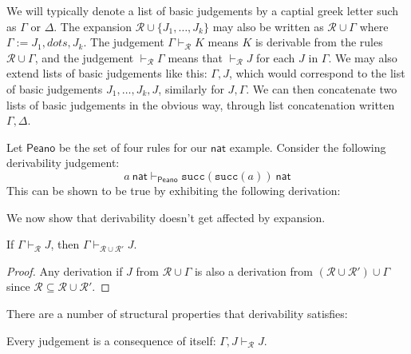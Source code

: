 \begin{remark}
    We will typically denote a list of basic judgements by a captial greek letter such as $\Gamma$ or $\Delta$. The expansion $\mathcal{R} \cup \{ J_1, \dots, J_k \}$ may also be written as $\mathcal{R} \cup \Gamma$ where $\Gamma := J_1, dots, J_k$. The judgement $\Gamma \vdash_{\mathcal{R}} K$ means $K$ is derivable from the rules $\mathcal{R} \cup \Gamma$, and the judgement $\vdash _{\mathcal{R}} \Gamma$ means that $\vdash _{\mathcal{R}} J$ for each $J$ in $\Gamma$. We may also extend lists of basic judgements like this: $\Gamma, J$, which would correspond to the list of basic judgements $J_1, \dots, J_k, J$, similarly for $J, \Gamma$. We can then concatenate two lists of basic judgements in the obvious way, through list concatenation written $\Gamma, \Delta$.
\end{remark}

\begin{example}
    Let $\mathsf{Peano}$ be the set of four rules for our $\mathsf{nat}$ example. Consider the following derivability judgement:
    $$a\ \mathsf{nat} \vdash_{\mathsf{Peano}} \texttt{succ}(\texttt{succ}(a))\ \mathsf{nat}$$
    This can be shown to be true by exhibiting the following derivation:
    \begin{prooftree}
    \end{prooftree}
\end{example}

We now show that derivability doesn't get affected by expansion.

\begin{lemma}[Stability]
    If $\Gamma \vdash_{\mathcal{R}} J$, then $\Gamma \vdash_{\mathcal{R} \cup \mathcal{R'}} J$.
\end{lemma}

\begin{proof}
    Any derivation if $J$ from $\mathcal{R} \cup \Gamma$ is also a derivation from $(\mathcal{R} \cup \mathcal{R}') \cup \Gamma$ since $\mathcal{R} \subseteq \mathcal{R}\cup \mathcal{R}'$.
\end{proof}

There are a number of structural properties that derivability satisfies:

\begin{lemma}[Reflexivity]
    Every judgement is a consequence of itself: $\Gamma, J\vdash_{\mathcal{R}} J$.
\end{lemma}

